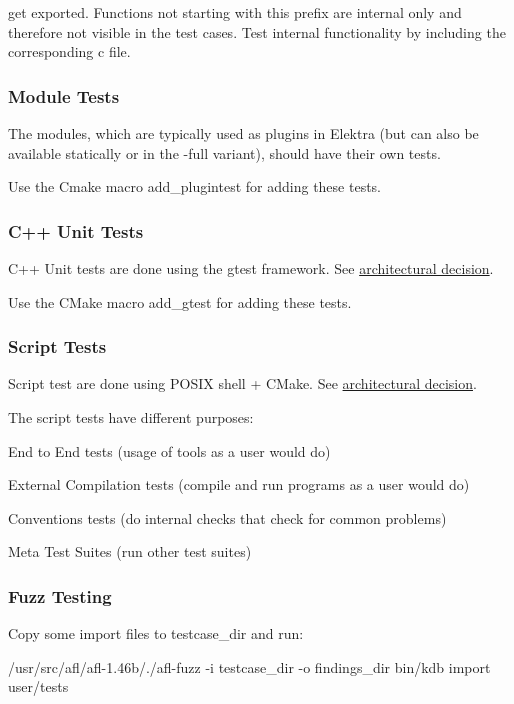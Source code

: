 get exported. Functions not starting with this prefix are internal only and therefore not visible in the test cases. Test internal functionality by including the corresponding c file.

\subsubsection*{Module Tests}

The modules, which are typically used as plugins in Elektra (but can also be available statically or in the {\ttfamily -\/full} variant), should have their own tests.

Use the Cmake macro {\ttfamily add\+\_\+plugintest} for adding these tests.

\subsubsection*{C++ Unit Tests}

C++ Unit tests are done using the gtest framework. See \hyperlink{doc_decisions_unit_testing_md}{architectural decision}.

Use the C\+Make macro {\ttfamily add\+\_\+gtest} for adding these tests.

\subsubsection*{Script Tests}

Script test are done using P\+O\+S\+I\+X shell + C\+Make. See \hyperlink{doc_decisions_script_testing_md}{architectural decision}.

The script tests have different purposes\+:
\begin{DoxyItemize}
\item End to End tests (usage of tools as a user would do)
\item External Compilation tests (compile and run programs as a user would do)
\item Conventions tests (do internal checks that check for common problems)
\item Meta Test Suites (run other test suites)
\end{DoxyItemize}

\subsubsection*{Fuzz Testing}

Copy some import files to testcase\+\_\+dir and run\+: \begin{DoxyVerb}/usr/src/afl/afl-1.46b/./afl-fuzz -i testcase_dir -o findings_dir bin/kdb import user/tests
\end{DoxyVerb}


